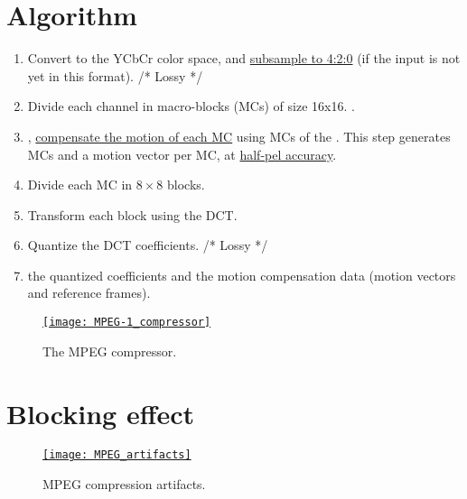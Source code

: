 \section{Algorithm}
\label{sec:MPEG-1_algo}
\begin{enumerate}
\item Convert to the \gls{YCbCr} color space, and
  \href{https://en.wikipedia.org/wiki/Chroma_subsampling}{subsample to
    4:2:0} (if the input is not yet in this format). /* Lossy */
\item Divide each channel in macro-blocks (MCs) of size 16x16. .
\item {},
  \href{https://en.wikipedia.org/wiki/Motion_compensation#Block_motion_compensation}{compensate
    the motion of each MC} using MCs of the . This step generates
   MCs and a motion vector per MC, at
  \href{https://en.wikipedia.org/wiki/Motion_compensation}{half-pel
    accuracy}.
\item Divide each MC in $8\times 8$ blocks.
\item Transform each block using the \gls{DCT}.
\item Quantize the \gls{DCT} coefficients. /* Lossy */
\item {} the quantized coefficients and the motion compensation
  data (motion vectors and reference frames).
\end{enumerate}

\begin{figure}[H]
  \vspace{-2ex}
  \centering
  \href{https://w3.ual.es/~vruiz/Docencia/Apuntes/Coding/Video/02-MPEG1/index.html}{\texttt{[image: MPEG-1\_compressor]}}
  \caption{The \gls{MPEG} compressor.}
  \label{fig:MPEG_compressor}
\end{figure}

\section{Blocking effect}
\begin{figure}[H]
  \vspace{-2ex}
  \centering
  \href{https://filmora.wondershare.com/video-editing/video-compression-artifacts.html}{\texttt{[image: MPEG\_artifacts]}}
  \caption{\gls{MPEG} compression artifacts.}
  \label{fig:MPEG_artifacts}
\end{figure}
